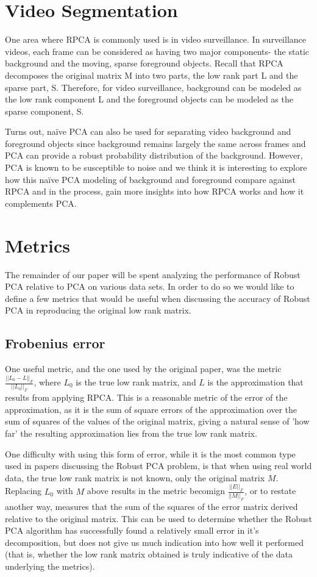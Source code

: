\documentclass[11pt]{scrartcl} %
\theoremstyle{plain}
\begin{document}
\section{Video Segmentation}

One area where RPCA is commonly used is in video surveillance. In surveillance videos, each frame can be considered as having two major components- the static background and the moving, sparse foreground objects. Recall that RPCA decomposes the original matrix M into two parts, the low rank part L and the sparse part, S. Therefore, for video surveillance, background can be modeled as the low rank component L and the foreground objects can be modeled as the sparse component, S.

Turns out, naïve PCA can also be used for separating video background and foreground objects since background remains largely the same across frames and PCA can provide a robust probability distribution of the background. However, PCA is known to be susceptible to noise and we think it is interesting to explore how this naïve PCA modeling of background and foreground compare against RPCA and in the process, gain more insights into how RPCA works and how it complements PCA.

\section{Metrics}
The remainder of our paper will be spent analyzing the performance of Robust PCA relative to PCA on various data sets. In order to do so we would like to define a few metrics that would be useful when discussing the accuracy of Robust PCA in reproducing the original low rank matrix.

\subsection{Frobenius error}
One useful metric, and the one used by the original paper, was the metric $\frac{||L_0 - L||_F}{||L_0||_F}$, where $L_0$ is the true low rank matrix, and $L$ is the approximation that results from applying RPCA. This is a reasonable metric of the error of the approximation, as it is the sum of square errors of the approximation over the sum of squares of the values of the original matrix, giving a natural sense of 'how far' the resulting approximation lies from the true low rank matrix.

One difficulty with using this form of error, while it is the most common type used in papers discussing the Robust PCA problem, is that when using real world data, the true low rank matrix is not known, only the original matrix $M$. Replacing $L_0$ with $M$ above results in the metric becomign $\frac{||E||_F}{||M||_F}$, or to restate another way, measures that the sum of the squares of the error matrix derived relative to the original matrix. This can be used to determine whether the Robust PCA algorithm has successfully found a relatively small error in it's decomposition, but does not give us much indication into how well it performed (that is, whether the low rank matrix obtained is truly indicative of the data underlying the metrics).
\end{document}
